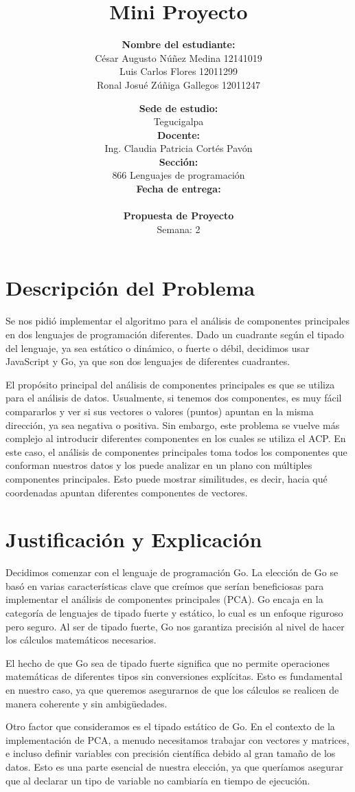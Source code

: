\documentclass{article}
\title{\textbf{\LARGE Mini Proyecto}}
\author{\textbf{Nombre del estudiante:}\\
\large César Augusto Núñez Medina 12141019\\
\large Luis Carlos Flores 12011299\\
\large Ronal Josué Zúñiga Gallegos 12011247}
\date{\textbf{Sede de estudio:}\\
\large Tegucigalpa\\
\textbf{Docente:}\\
\large Ing. Claudia Patricia Cortés Pavón\\
\textbf{Sección:}\\
\large 866 Lenguajes de programación\\
\textbf{Fecha de entrega:}\\
\large \DTMtoday\\ %
\textbf{Propuesta de Proyecto}\\
\large Semana: 2}
\begin{document}
\maketitle

\section*{Descripción del Problema}

Se nos pidió implementar el algoritmo para el análisis de componentes principales en dos lenguajes de programación diferentes. Dado un cuadrante según el tipado del lenguaje, ya sea estático o dinámico, o fuerte o débil, decidimos usar JavaScript y Go, ya que son dos lenguajes de diferentes cuadrantes.

El propósito principal del análisis de componentes principales es que se utiliza para el análisis de datos. Usualmente, si tenemos dos componentes, es muy fácil compararlos y ver si sus vectores o valores (puntos) apuntan en la misma dirección, ya sea negativa o positiva. Sin embargo, este problema se vuelve más complejo al introducir diferentes componentes en los cuales se utiliza el ACP. En este caso, el análisis de componentes principales toma todos los componentes que conforman nuestros datos y los puede analizar en un plano con múltiples componentes principales. Esto puede mostrar similitudes, es decir, hacia qué coordenadas apuntan diferentes componentes de vectores.

\section*{Justificación y Explicación}

Decidimos comenzar con el lenguaje de programación Go. La elección de Go se basó en varias características clave que creímos que serían beneficiosas para implementar el análisis de componentes principales (PCA). Go encaja en la categoría de lenguajes de tipado fuerte y estático, lo cual es un enfoque riguroso pero seguro. Al ser de tipado fuerte, Go nos garantiza precisión al nivel de hacer los cálculos matemáticos necesarios. 

El hecho de que Go sea de tipado fuerte significa que no permite operaciones matemáticas de diferentes tipos sin conversiones explícitas. Esto es fundamental en nuestro caso, ya que queremos asegurarnos de que los cálculos se realicen de manera coherente y sin ambigüedades.

Otro factor que consideramos es el tipado estático de Go. En el contexto de la implementación de PCA, a menudo necesitamos trabajar con vectores y matrices, e incluso definir variables con precisión científica debido al gran tamaño de los datos. Esto es una parte esencial de nuestra elección, ya que queríamos asegurar que al declarar un tipo de variable no cambiaría en tiempo de ejecución.
\end{document}
